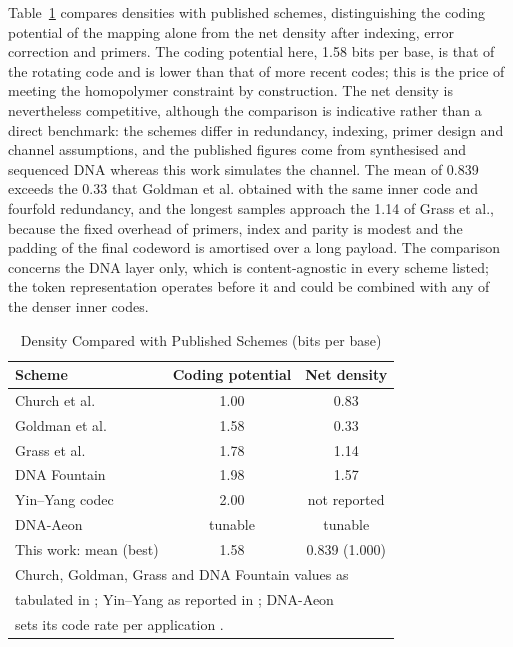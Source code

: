 \documentclass[conference]{IEEEtran}
\begin{document}
Table~\ref{tab:density} compares densities with published schemes, distinguishing the coding potential of the mapping alone from the net density after indexing, error correction and primers. The coding potential here, 1.58 bits per base, is that of the rotating code and is lower than that of more recent codes; this is the price of meeting the homopolymer constraint by construction. The net density is nevertheless competitive, although the comparison is indicative rather than a direct benchmark: the schemes differ in redundancy, indexing, primer design and channel assumptions, and the published figures come from synthesised and sequenced DNA whereas this work simulates the channel. The mean of 0.839 exceeds the 0.33 that Goldman et al. obtained with the same inner code and fourfold redundancy, and the longest samples approach the 1.14 of Grass et al., because the fixed overhead of primers, index and parity is modest and the padding of the final codeword is amortised over a long payload. The comparison concerns the DNA layer only, which is content-agnostic in every scheme listed; the token representation operates before it and could be combined with any of the denser inner codes.

\begin{table}[htbp]
\caption{Density Compared with Published Schemes (bits per base)}
\label{tab:density}
\centering
\footnotesize
\begin{tabular}{lcc}
\hline
\textbf{Scheme} & \textbf{Coding potential} & \textbf{Net density} \\
\hline
Church et al. \cite{church} & 1.00 & 0.83 \\
Goldman et al. \cite{goldman} & 1.58 & 0.33 \\
Grass et al. \cite{grass} & 1.78 & 1.14 \\
DNA Fountain \cite{erlich} & 1.98 & 1.57 \\
Yin--Yang codec \cite{ping} & 2.00 & not reported \\
DNA-Aeon \cite{welzel} & tunable & tunable \\
This work: mean (best) & 1.58 & 0.839 (1.000) \\
\hline
\multicolumn{3}{l}{Church, Goldman, Grass and DNA Fountain values as} \\
\multicolumn{3}{l}{tabulated in \cite{erlich}; Yin--Yang as reported in \cite{ping}; DNA-Aeon} \\
\multicolumn{3}{l}{sets its code rate per application \cite{welzel}.} \\
\end{tabular}
\end{table}
\end{document}
